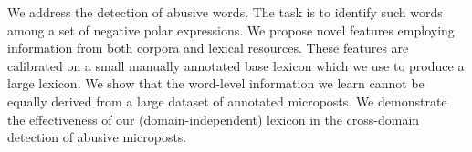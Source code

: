 We address the detection of abusive words. The task is to identify such words among a set of negative polar expressions. We propose novel features employing information from both corpora and lexical resources. These features are calibrated on a small manually annotated base lexicon which we use to produce a large lexicon. We show that the word-level information we learn cannot be equally derived from a large dataset of annotated microposts. We demonstrate the effectiveness of our (domain-independent) lexicon in the cross-domain detection of abusive microposts.
